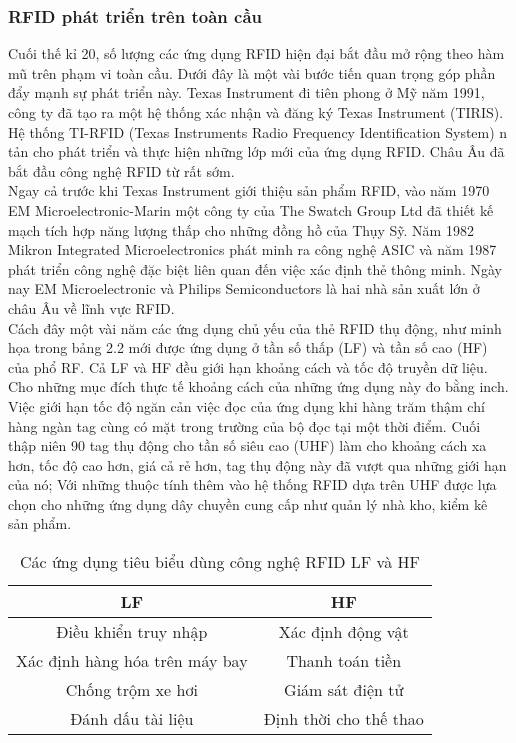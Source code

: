 \subsubsection{RFID phát triển trên toàn cầu}
Cuối thế kỉ 20, số lượng các ứng dụng RFID hiện đại bắt đầu mở rộng theo hàm mũ trên phạm vi toàn cầu. Dưới đây là một vài bước tiến quan trọng góp phần đẩy mạnh sự phát triển này. Texas Instrument đi tiên phong ở Mỹ  năm 1991, công ty đã tạo ra một hệ thống xác nhận và đăng ký Texas Instrument (TIRIS). Hệ thống TI-RFID (Texas Instruments Radio Frequency Identification System) n tản cho phát triển và thực hiện những lớp mới của ứng dụng RFID. Châu Âu đã bắt đầu công nghệ RFID từ rất sớm.\\
Ngay cả trước khi Texas Instrument giới thiệu sản phẩm RFID, vào năm 1970 EM Microelectronic-Marin một công ty của The Swatch Group Ltd đã thiết kế mạch tích hợp năng lượng thấp cho những đồng hồ của Thụy Sỹ. Năm 1982 Mikron Integrated Microelectronics phát minh ra công nghệ ASIC và năm 1987 phát triển công nghệ đặc biệt liên quan đến việc xác định thẻ thông minh. Ngày nay EM Microelectronic và Philips Semiconductors là hai nhà sản xuất lớn ở châu Âu về lĩnh vực RFID.\\
Cách đây một vài năm các ứng dụng chủ yếu của thẻ RFID thụ động, như minh họa trong bảng 2.2 mới được ứng dụng ở tần số thấp (LF) và tần số cao (HF) của phổ RF. Cả LF và HF đều giới hạn khoảng cách và tốc độ truyền dữ liệu. Cho những mục đích thực tế khoảng cách của những ứng dụng này đo bằng inch. Việc giới hạn tốc độ ngăn cản việc đọc của ứng dụng khi hàng trăm thậm chí hàng ngàn tag cùng có mặt trong trường của bộ đọc tại một thời điểm. Cuối thập niên 90 tag thụ động cho tần số siêu cao (UHF) làm cho khoảng cách xa hơn, tốc độ cao hơn, giá cả rẻ hơn, tag thụ động này đã vượt qua những giới hạn của nó; Với những thuộc tính thêm vào hệ thống RFID dựa trên UHF được lựa chọn cho những ứng dụng dây chuyền cung cấp như quản lý nhà kho, kiểm kê sản phẩm.
\begin{table}
	\centering
	\begin{tabular}{|c|c|}
	\hline 
	LF & HF \\ 
	\hline 
	Điều khiển truy nhập & Xác định động vật \\ 
	\hline 
	Xác định hàng hóa trên máy bay & Thanh toán tiền \\ 
	\hline 
	Chống trộm xe hơi & Giám sát điện tử \\ 
	\hline 
	Đánh dấu tài liệu & Định thời cho thế thao \\ 
	\hline 
	\end{tabular} 
	\caption{Các ứng dụng tiêu biểu dùng công nghệ RFID LF và HF}
	\label{bang1}
\end{table}
